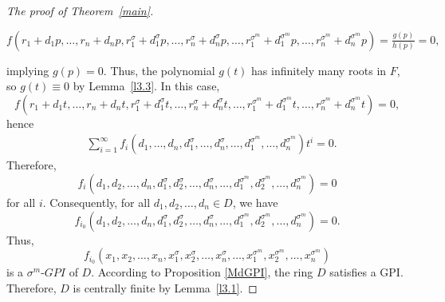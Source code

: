 \documentclass{cimart}
\begin{document}
\begin{proof}[The proof of {\rm Theorem~\ref{main}}]
	\begin{center}
$f(r_1+d_1p,\dots,r_n+d_np,r_1^\sigma+d_1^\sigma p,\dots,r_n^\sigma+d_n^\sigma p,\dots,r_1^{\sigma^m}+d_1^{\sigma^m}p,\dots,r_n^{\sigma^m}+d_n^{\sigma^m}p)
	=  \frac{g(p)}{h(p)}=0,$
	\end{center}
	implying $g(p)=0$. Thus, the polynomial $g(t)$ has infinitely many roots in $F$, so $g(t)\equiv 0$ by Lemma~\ref{l3.3}. In this case, $$f(r_1+d_1t,\dots,r_n+d_nt,r_1^\sigma+d_1^\sigma t,\dots,r_n^\sigma+d_n^\sigma t,\dots,r_1^{\sigma^m}+d_1^{\sigma^m}t,\dots,r_n^{\sigma^m}+d_n^{\sigma^m}t)=0,$$ hence
	\begin{align*}
	&\sum_{i=1}^\infty f_i(d_1,\dots,d_n,d_1^\sigma,\dots,d_n^\sigma,\dots,d_1^{\sigma^m},\dots,d_n^{\sigma^m})t^i=0.
	\end{align*}
	Therefore, 
    \[
    f_i(d_1, d_2, \dots,d_n,d_1^{\sigma}, d_2^{\sigma},  \dots,d_n^{\sigma},\dots, d_1^{\sigma^m}, d_2^{\sigma^m}, \dots, d_n^{\sigma^m})=0
    \]
    for all $i$. Consequently, for all $d_1, d_2, \dots, d_n\in D$, we have $$f_{i_0}(d_1, d_2, \dots,d_n,d_1^{\sigma}, d_2^{\sigma},  \dots,d_n^{\sigma},\dots, d_1^{\sigma^m}, d_2^{\sigma^m}, \dots, d_n^{\sigma^m})=0.$$ Thus, $$f_{i_0}(x_1, x_2, \dots, x_n, x_1^{\sigma}, x_2^{\sigma} ,\dots, x_n^{\sigma}, \dots,x_1^{\sigma^m}, x_2^{\sigma^m}, \dots, x_n^{\sigma^m} )$$ is a $\sigma^m$-$GPI$ of $D$. According to Proposition \ref{MdGPI}, the ring $D$ satisfies a GPI. Therefore, $D$ is centrally finite by Lemma~\ref{l3.1}.
\end{proof}

\end{document}
